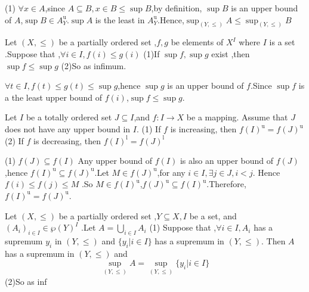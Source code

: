 \documentclass{book}
\numberwithin{equation}{section}
\begin{document}
\begin{proofenv}
    \quad
    \newline
    (1) $\forall x\in A$,since $A\subseteq B,x\in B \le \sup B$,by definition, $\sup B$ is an upper bound of $A$,$\sup B\in A_Y^\mathrm{u}$.$\sup A$ is the least in $A_Y^\mathrm{u}$.Hence,$\sup_{(Y,\le)}A \le \sup_{(Y,\le)}B$
\end{proofenv}
\begin{propositionenv}\label{proposition4.5.3}
    Let $(X,\le )$ be a partially ordered set ,$f,g$ be elements of $X^I$ where $I$ is a set .Suppose that ,$\forall i\in  I ,f(i)\le g(i)$
 \newline
 (1)If $\sup f,\sup g$ exist ,then $\sup f\le\sup g$
 \newline
 (2)So as infimum.
\end{propositionenv}
\begin{proofenv}
    $\forall t\in I,f(t)\le g(t)\le \sup g$,hence $\sup g$ is an upper bound of $f$.Since $\sup f $ is a the least upper bound of $f(i)$,$\sup f\le\sup g$.
\end{proofenv}
\begin{propositionenv}
    Let $I$ be a totally ordered set $J\subseteq I $,and $f:I\rightarrow X $ be a mapping. Assume that $J$ does not have any upper bound in $I$.
    \newline 
    (1) If $f$ is increasing, then $f(I)^\mathrm{u}=f(J)^\mathrm{u}$
    \newline
    (2) If $f$ is decreasing, then $f(I)^\mathrm{l}=f(J)^\mathrm{l}$
\end{propositionenv}
\begin{proofenv}
    \quad 
    \newline
    (1) $f(J)\subseteq f(I)$ Any upper bound of $f(I)$ is also an upper bound of $f(J)$,hence $f(I)^\mathrm{u}\subseteq f(J)^\mathrm{u}$.Let $M\in f(J)^\mathrm{u}$,for any $i\in I,\exists j\in J,i<j$. Hence $f(i)\le f(j)\le M$ .So $M\in f(I)^\mathrm{u}$,$f(J)^\mathrm{u}\subseteq f(I)^\mathrm{u}$.Therefore,$f(I)^\mathrm{u}=f(J)^\mathrm{u}$.
\end{proofenv}
\begin{propositionenv}
    Let $(X,\le)$ be a partially ordered set ,$Y\subseteq X,I$ be a set, and $(A_i)_{i\in I}\in \wp (Y)^I$ .Let $A=\bigcup _{i\in I}A_i$
    \newline
    (1) Suppose that ,$\forall i \in I,A_i$ has a supremum $y_i$ in $(Y,\le)$ and $\{y_i|i\in I\}$ has a supremum in $(Y,\le)$. Then $A$ has a supremum in $(Y,\le )$ and $$\sup_{(Y,\le)}A=\sup_{(Y,\le)}\{y_i|i\in I\}$$
    \newline
    (2)So as inf
\end{propositionenv}
\end{document}
